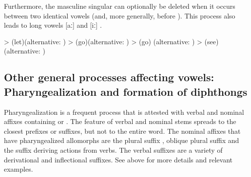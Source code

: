 Furthermore, the masculine singular   can optionally be deleted when it occurs between two identical vowels (and, more generally, before ). This process also leads to long vowels [aː] and [iː] .
%
\begin{exe}
	\ex	\label{ex:identical vowels B phon}
	\begin{xlist}
		\ex	{} >   (let)\newline\hspace*{1em}(alternative: )
		\ex	{} >   (go)\newline\hspace*{1em}(alternative: )
		\ex	{} >   \newline\hspace*{1em}(go) (alternative: )
		\ex	{} >   (see)\newline\hspace*{1em}(alternative: )
	\end{xlist}
\end{exe}



\subsection{Other general processes affecting vowels: Pharyngealization and formation of diphthongs}
\label{ssec:Other general processes affecting vowels}

Pharyngealization is a frequent process that is attested with verbal and nominal affixes containing  or . The  feature of verbal and nominal stems spreads to the closest prefixes or suffixes, but not to the entire word. The nominal affixes that have pharyngealized allomorphs are the plural suffix , oblique plural suffix  and the suffix  deriving actions  from verbs. The verbal suffixes are a variety of derivational and inflectional suffixes. See  above for more details and relevant examples.

